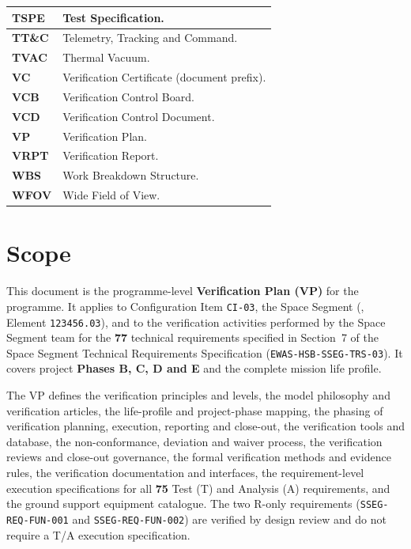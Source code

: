 {\begin{longtable}{|>{\raggedright\arraybackslash}p{3.2cm}|>{\raggedright\arraybackslash}p{12.2cm}|}
\textbf{TSPE} & Test Specification. \\ \hline
\textbf{TT\&C} & Telemetry, Tracking and Command. \\ \hline
\textbf{TVAC} & Thermal Vacuum. \\ \hline
\textbf{VC} & Verification Certificate (document prefix). \\ \hline
\textbf{VCB} & Verification Control Board. \\ \hline
\textbf{VCD} & Verification Control Document. \\ \hline
\textbf{VP} & Verification Plan. \\ \hline
\textbf{VRPT} & Verification Report. \\ \hline
\textbf{WBS} & Work Breakdown Structure. \\ \hline
\textbf{WFOV} & Wide Field of View. \\ \hline
\end{longtable}}

\section{Scope}

This document is the programme-level \textbf{Verification Plan (VP)} for the  programme. It applies to Configuration Item \texttt{CI-03}, the  Space Segment (,  Element \texttt{123456.03}), and to the verification activities performed by the Space Segment team for the \textbf{77} technical requirements specified in Section~7 of the Space Segment Technical Requirements Specification (\texttt{EWAS-HSB-SSEG-TRS-03}). It covers project \textbf{Phases B, C, D and E} and the complete mission life profile.

The VP defines the verification principles and levels, the model philosophy and verification articles, the life-profile and project-phase mapping, the phasing of verification planning, execution, reporting and close-out, the verification tools and database, the non-conformance, deviation and waiver process, the verification reviews and close-out governance, the formal verification methods and evidence rules, the verification documentation and interfaces, the requirement-level execution specifications for all \textbf{75} Test (T) and Analysis (A) requirements, and the ground support equipment catalogue. The two R-only requirements (\texttt{SSEG-REQ-FUN-001} and \texttt{SSEG-REQ-FUN-002}) are verified by design review and do not require a T/A execution specification.

